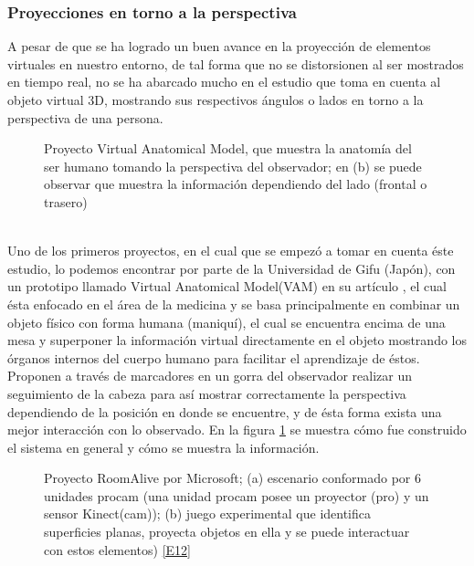 \documentclass[a4paper,openright,12pt]{report}
\begin{document}
\subsubsection{Proyecciones en torno a la perspectiva}
A pesar de que se ha logrado un buen avance en la proyección de elementos virtuales en nuestro entorno, de tal forma que no se distorsionen al ser mostrados en tiempo real, no se ha abarcado mucho en el estudio que toma en cuenta al objeto virtual 3D, mostrando sus respectivos ángulos o lados en torno a la perspectiva de una persona.
\begin{figure}[thb]
	\centering
	\caption[Proyecto Virtual Anatomical Model]{Proyecto Virtual Anatomical Model, que muestra la anatomía del ser humano tomando la perspectiva del observador; en (b) se puede observar que muestra la información dependiendo del lado (frontal o trasero) \cite{kondo2008}} \label{fig:vam}
\end{figure}\\
Uno de los primeros proyectos, en el cual que se empezó a tomar en cuenta éste estudio, lo podemos encontrar por parte de la Universidad de Gifu (Japón), con un prototipo llamado Virtual Anatomical Model(VAM) en su artículo \cite{kondo2008}, el cual ésta enfocado en el área de la medicina y se basa principalmente en combinar un objeto físico con forma humana (maniquí), el cual se encuentra encima de una mesa y superponer la información virtual directamente en el objeto mostrando los órganos internos del cuerpo humano para facilitar el aprendizaje de éstos. Proponen a través de marcadores en un gorra del observador realizar un seguimiento de la cabeza para así mostrar correctamente la perspectiva dependiendo de la posición en donde se encuentre, y de ésta forma exista una mejor interacción con lo observado. En la figura \ref{fig:vam} se muestra cómo fue construido el sistema en general y cómo se muestra la información.
\begin{figure}[htb]
	\centering
	\caption[Proyecto RoomAlive por Microsoft\textregistered]{Proyecto RoomAlive por Microsoft\textregistered; (a) escenario conformado por 6 unidades procam (una unidad procam posee un proyector (pro) y un sensor Kinect\textcopyright(cam)); (b) juego experimental que identifica superficies planas, proyecta objetos en ella y se puede interactuar con estos elementos) \hyperlink{e12}{[E12]}} \label{fig:perspectiva}
\end{figure}\\
\end{document}
